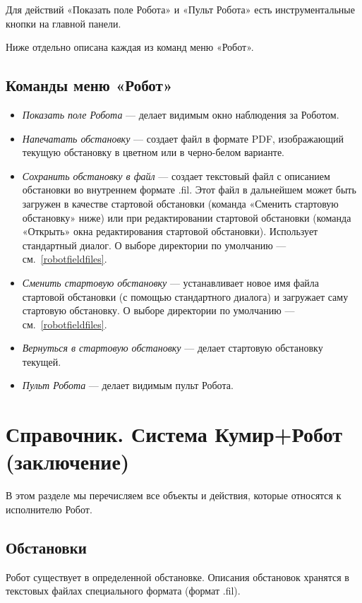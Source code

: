 Для действий «Показать поле Робота» и «Пульт Робота» есть инструментальные кнопки на главной панели.

Ниже отдельно описана каждая из команд меню «Робот».

\subsection[Команды меню ''Робот'']{Команды меню «Робот»}

\begin{itemize}
\item \emph{Показать поле Робота} --- делает видимым окно наблюдения за Роботом.
\item \emph{Напечатать обстановку} --- создает файл в формате PDF, изображающий текущую обстановку в цветном или в черно-белом варианте.\label{robotprinttopdf}
\item \emph{Сохранить обстановку в файл} --- создает текстовый файл с описанием обстановки во внутреннем формате .fil. Этот файл в дальнейшем может быть загружен в качестве стартовой обстановки (команда «Сменить стартовую обстановку» ниже) или при редактировании стартовой обстановки (команда «Открыть» окна редактирования стартовой обстановки). Использует стандартный диалог. О выборе директории по умолчанию --- см.~\ref{robotfieldfiles}.
\item \emph{Сменить стартовую обстановку} --- устанавливает новое имя файла стартовой обстановки (с помощью стандартного диалога) и загружает саму стартовую обстановку. О выборе директории по умолчанию --- см.~\ref{robotfieldfiles}.
\item \emph{Вернуться в стартовую обстановку} --- делает стартовую обстановку текущей.
\item \emph{Пульт Робота} --- делает видимым пульт Робота.
\end{itemize}

\section{Справочник. Система Кумир+Робот (заключение)}

В этом разделе мы перечисляем все объекты и действия, которые относятся к исполнителю Робот.

\subsection{Обстановки}

Робот существует в определенной обстановке. Описания обстановок хранятся в текстовых файлах специального формата (формат .fil).

